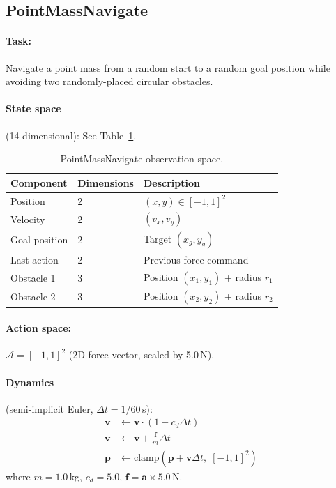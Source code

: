\documentclass[11pt,a4paper]{article}
\newcommand{\cA}{\mathcal{A}}
\newcommand{\bvf}{\mathbf{v}}
\newcommand{\bpf}{\mathbf{p}}
\newcommand{\bff}{\mathbf{f}}
\newcommand{\ba}{\mathbf{a}}
\begin{document}
\subsection{PointMassNavigate}
\label{sec:env_pointmass}

\paragraph{Task:} Navigate a point mass from a random start to a random goal position while avoiding two randomly-placed circular obstacles.

\paragraph{State space} (14-dimensional): See Table~\ref{tab:pm_obs}.

\begin{table}[htbp]
  \centering
  \caption{PointMassNavigate observation space.}
  \label{tab:pm_obs}
  \begin{tabular}{@{}lll@{}}
    \toprule
    \textbf{Component} & \textbf{Dimensions} & \textbf{Description} \\
    \midrule
    Position       & 2 & $(x, y) \in [-1, 1]^2$ \\
    Velocity       & 2 & $(v_x, v_y)$ \\
    Goal position  & 2 & Target $(x_g, y_g)$ \\
    Last action    & 2 & Previous force command \\
    Obstacle 1     & 3 & Position $(x_1, y_1)$ + radius $r_1$ \\
    Obstacle 2     & 3 & Position $(x_2, y_2)$ + radius $r_2$ \\
    \bottomrule
  \end{tabular}
\end{table}

\paragraph{Action space:} $\cA = [-1, 1]^2$ (2D force vector, scaled by 5.0\,N).

\paragraph{Dynamics} (semi-implicit Euler, $\Delta t = 1/60$\,s):
\begin{align}
  \bvf &\leftarrow \bvf \cdot (1 - c_d \Delta t) \\
  \bvf &\leftarrow \bvf + \frac{\bff}{m} \Delta t \\
  \bpf &\leftarrow \text{clamp}\!\left(\bpf + \bvf \Delta t,\; [-1, 1]^2\right)
\end{align}
where $m = 1.0$\,kg, $c_d = 5.0$, $\bff = \ba \times 5.0$\,N.
\end{document}
